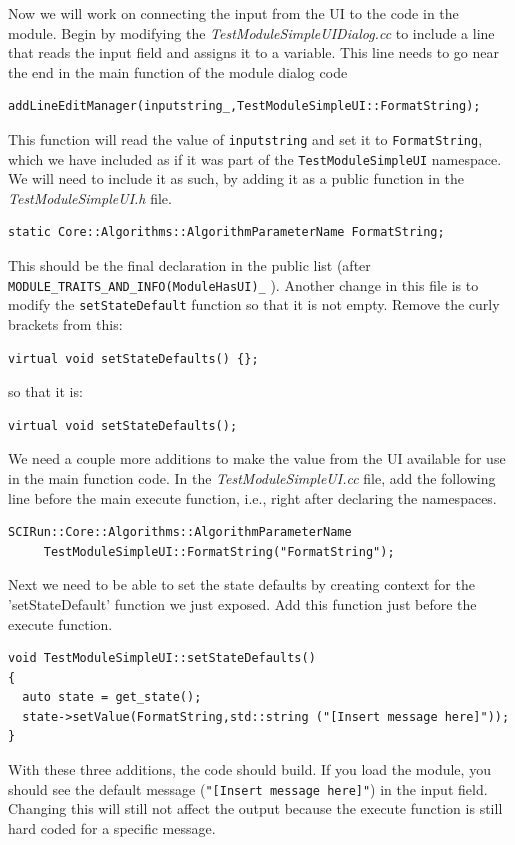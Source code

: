 \documentclass[fleqn,11pt,openany]{book}
\begin{document}
Now we will work on connecting the input from the UI to the code in the module.  
Begin by modifying the \emph{TestModuleSimpleUIDialog.cc} to include a line that reads the input field and assigns it to a variable. 
This line needs to go near the end in the main function of the module dialog code
\begin{verbatim}
addLineEditManager(inputstring_,TestModuleSimpleUI::FormatString);
\end{verbatim}
This function will read the value of \verb|inputstring| and set it to \verb|FormatString|, which we have included as if it was part of the \verb|TestModuleSimpleUI| namespace.  
We will need to include it as such, by adding it as a public function in the \emph{TestModuleSimpleUI.h} file.
\begin{verbatim}
static Core::Algorithms::AlgorithmParameterName FormatString;
\end{verbatim}
This should be the final declaration in the public list (after \verb|MODULE_TRAITS_AND_INFO(ModuleHasUI)_| ).
Another change in this file is to modify the \verb|setStateDefault| function so that it is not empty.  
Remove the curly brackets from this:
\begin{verbatim}
virtual void setStateDefaults() {};
\end{verbatim}
so that it is:
\begin{verbatim}
virtual void setStateDefaults();
\end{verbatim}
We need a couple more additions to make the value from the UI available for use in the main function code.  
In the \emph{TestModuleSimpleUI.cc} file, add the following line before the main execute function, i.e., right after declaring the namespaces.
\begin{verbatim}
SCIRun::Core::Algorithms::AlgorithmParameterName 
   	 TestModuleSimpleUI::FormatString("FormatString");
\end{verbatim}

Next we need to be able to set the state defaults by creating context for the 'setStateDefault' function we just exposed.
Add this function just before the execute function.
\begin{verbatim}
void TestModuleSimpleUI::setStateDefaults()
{
  auto state = get_state();
  state->setValue(FormatString,std::string ("[Insert message here]"));
}
\end{verbatim}
With these three additions, the code should build.
If you load the module, you should see the default message (\verb|"[Insert message here]"|) in the input field.  
Changing this will still not affect the output because the execute function is still hard coded for a specific message.  
\end{document}
